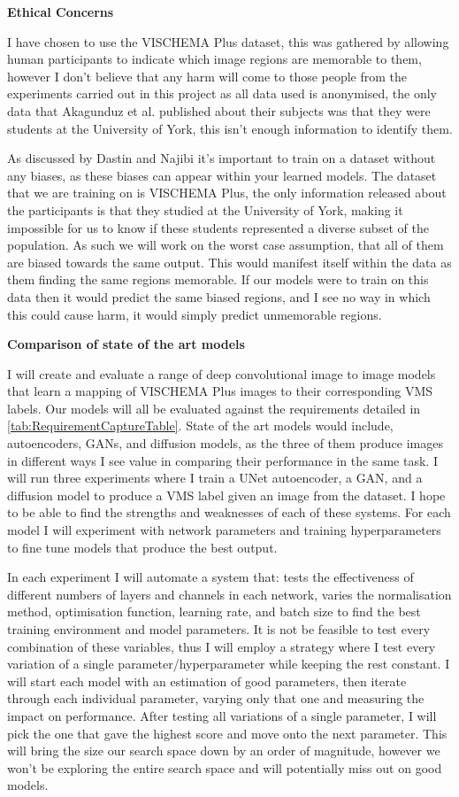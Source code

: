 \documentclass{UoYCSproject}
\begin{document}
\textbf{Ethical Concerns}

I have chosen to use the VISCHEMA Plus dataset, this was gathered by allowing human participants to indicate which image regions are memorable to them, however I don't believe that any harm will come to those people from the experiments carried out in this project as all data used is anonymised, the only data that Akagunduz et al. published about their subjects was that they were students at the University of York, this isn't enough information to identify them.

As discussed by Dastin \cite{dastin_2018} and Najibi \cite{najibi_2020} it's important to train on a dataset without any biases, as these biases can appear within your learned models. The dataset that we are training on is VISCHEMA Plus, the only information released about the participants is that they studied at the University of York, making it impossible for us to know if these students represented a diverse subset of the population. As such we will work on the worst case assumption, that all of them are biased towards the same output. This would manifest itself within the data as them finding the same regions memorable. If our models were to train on this data then it would predict the same biased regions, and I see no way in which this could cause harm, it would simply predict unmemorable regions.

\textbf{Comparison of state of the art models}

I will create and evaluate a range of deep convolutional image to image models that learn a mapping of VISCHEMA Plus images to their corresponding VMS labels. Our models will all be evaluated against the requirements detailed in \ref{tab:RequirementCaptureTable}. State of the art models would include, autoencoders, GANs, and diffusion models, as the three of them produce images in different ways I see value in comparing their performance in the same task. I will run three experiments where I train a UNet autoencoder, a GAN, and a diffusion model to produce a VMS label given an image from the dataset. I hope to be able to find the strengths and weaknesses of each of these systems. For each model I will experiment with network parameters and training hyperparameters to fine tune models that produce the best output.

In each experiment I will automate a system that: tests the effectiveness of different numbers of layers and channels in each network, varies the normalisation method, optimisation function, learning rate, and batch size to find the best training environment and model parameters. It is not be feasible to test every combination of these variables, thus I will employ a strategy where I test every variation of a single parameter/hyperparameter while keeping the rest constant. I will start each model with an estimation of good parameters, then iterate through each individual parameter, varying only that one and measuring the impact on performance. After testing all variations of a single parameter, I will pick the one that gave the highest score and move onto the next parameter. This will bring the size our search space down by an order of magnitude, however we won't be exploring the entire search space and will potentially miss out on good models. 
\end{document}

